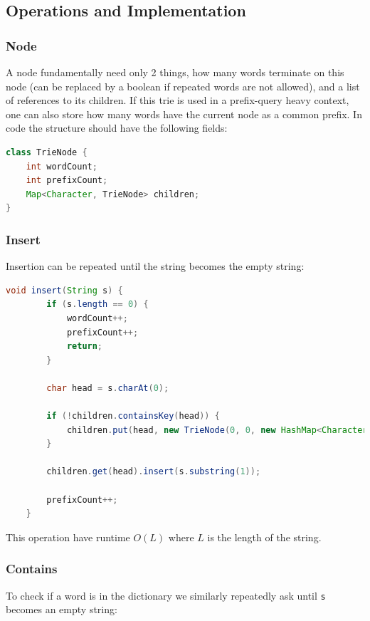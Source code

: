 \documentclass[12 pt, twoside] {article}
\begin{document}
{\subsection*{Operations and Implementation}

\subsubsection*{Node}

A node fundamentally need only 2 things, how many words terminate on this node
(can be replaced by a boolean if repeated words are not allowed), and a list of
references to its children. If this trie is used in a prefix-query heavy
context, one can also store how many words have the current node as a common
prefix. In code the structure should have the following fields:

\begin{lstlisting}[language=Java]
class TrieNode {
    int wordCount;
    int prefixCount;
    Map<Character, TrieNode> children;
}
\end{lstlisting}

\subsubsection*{Insert}

Insertion can be repeated until the string becomes the empty string:

\begin{lstlisting}[language=Java]
    void insert(String s) {
        if (s.length == 0) {
            wordCount++;
            prefixCount++;
            return;
        }

        char head = s.charAt(0);

        if (!children.containsKey(head)) {
            children.put(head, new TrieNode(0, 0, new HashMap<Character, TrieNode>()));
        }

        children.get(head).insert(s.substring(1));

        prefixCount++;
    }
\end{lstlisting}

This operation have runtime $O(L)$ where $L$ is the length of the string.

\subsubsection*{Contains}

To check if a word is in the dictionary we similarly repeatedly ask until
\texttt{s} becomes an empty string:

}
\end{document}
